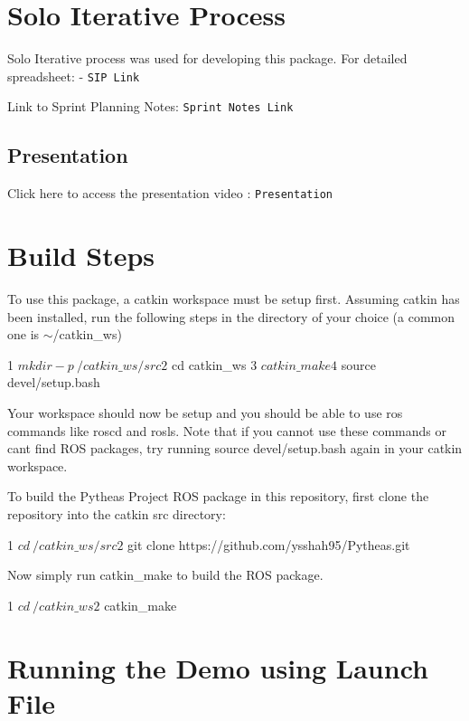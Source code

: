 \section*{Solo Iterative Process}

Solo Iterative process was used for developing this package. For detailed spreadsheet\+: -\/ {\tt S\+IP Link}

Link to Sprint Planning Notes\+: {\tt Sprint Notes Link}

\subsection*{Presentation}

Click here to access the presentation video \+: {\tt Presentation}

\section*{Build Steps}

To use this package, a catkin workspace must be setup first. Assuming catkin has been installed, run the following steps in the directory of your choice (a common one is $\sim$/catkin\+\_\+ws) 
\begin{DoxyCode}
1 $ mkdir -p ~/catkin\_ws/src
2 $ cd catkin\_ws
3 $ catkin\_make
4 $ source devel/setup.bash
\end{DoxyCode}
 Your workspace should now be setup and you should be able to use ros commands like {\ttfamily roscd} and {\ttfamily rosls}. Note that if you cannot use these commands or can\textquotesingle{}t find R\+OS packages, try running {\ttfamily source devel/setup.\+bash} again in your catkin workspace.

To build the Pytheas Project R\+OS package in this repository, first clone the repository into the catkin {\ttfamily src} directory\+: 
\begin{DoxyCode}
1 $ cd ~/catkin\_ws/src
2 $ git clone https://github.com/ysshah95/Pytheas.git
\end{DoxyCode}
 Now simply run catkin\+\_\+make to build the R\+OS package. 
\begin{DoxyCode}
1 $ cd ~/catkin\_ws
2 $ catkin\_make
\end{DoxyCode}


\section*{Running the Demo using Launch File}

